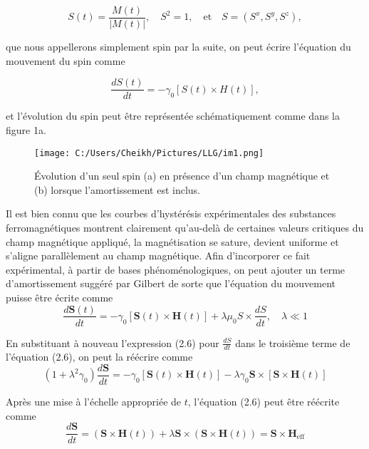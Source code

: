 \documentclass{article}
\begin{document}
	\begin{equation}
	S(t) = \frac{M(t)}{|M(t)|}, \quad S^2 = 1, \quad \text{et} \quad S = (S^x, S^y, S^z),
	\end{equation}
	
	que nous appellerons simplement spin par la suite, on peut écrire l'équation du mouvement du spin comme
	
	\begin{equation}
	\frac{dS(t)}{dt} = -\gamma_0 [S(t) \times H(t)],
	\end{equation}
	
	et l'évolution du spin peut être représentée schématiquement comme dans la figure 1a.
	
	\begin{figure}[htbp]
		\centering
		\texttt{[image: C:/Users/Cheikh/Pictures/LLG/im1.png]}
		\caption{Évolution d'un seul spin (a) en présence d'un champ magnétique et (b) lorsque l'amortissement est inclus.}
		\label{fig:spin_evolution}
	\end{figure}
	
	Il est bien connu que les courbes d'hystérésis expérimentales des substances ferromagnétiques montrent clairement qu'au-delà de certaines valeurs critiques du champ magnétique appliqué, la magnétisation se sature, devient uniforme et s'aligne parallèlement au champ magnétique. Afin d'incorporer ce fait expérimental, à partir de bases phénoménologiques, on peut ajouter un terme d'amortissement suggéré par Gilbert \cite{gilbert} de sorte que l'équation du mouvement puisse être écrite comme
	\begin{equation}
	\frac{d\mathbf{S}(t)}{dt} = -\gamma_0[\mathbf{S}(t) \times \mathbf{H}(t)] + \lambda\mu_0 S \times \frac{dS}{dt}, \quad \lambda \ll 1
	\end{equation}
	
	En substituant à nouveau l'expression (2.6) pour $\frac{dS}{dt}$ dans le troisième terme de l'équation (2.6), on peut la réécrire comme
	\begin{equation}
	(1+\lambda^2\gamma_0)\frac{d\mathbf{S}}{dt} = -\gamma_0[\mathbf{S}(t) \times \mathbf{H}(t)] - \lambda \gamma_0 \mathbf{S} \times [\mathbf{S} \times \mathbf{H}(t)]
	\end{equation}
	
	Après une mise à l'échelle appropriée de $t$, l'équation (2.6) peut être réécrite comme
	\begin{equation}
	\frac{d\mathbf{S}}{dt} = (\mathbf{S} \times \mathbf{H}(t)) + \lambda \mathbf{S} \times (\mathbf{S} \times \mathbf{H}(t)) = \mathbf{S} \times \mathbf{H}_{\text{eff}}
	\end{equation}
	
\end{document}
